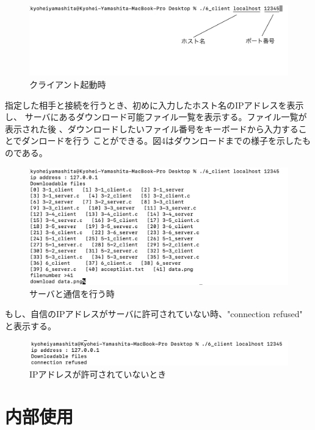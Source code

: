\documentclass[dvipdfmx,autodetect-engine,titlepage]{jsarticle}
\begin{document}
\begin{figure}[h]
    \centering
    \includegraphics[scale=0.8]{pic1.png}
    \caption{クライアント起動時}
\end{figure}

指定した相手と接続を行うとき、初めに入力したホスト名のIPアドレスを表示し、
サーバにあるダウンロード可能ファイル一覧を表示する。ファイル一覧が表示された後
、ダウンロードしたいファイル番号をキーボードから入力することでダンロードを行う
ことができる。図4はダウンロードまでの様子を示したものである。

\begin{figure}[h]
    \centering
    \includegraphics[scale=0.8]{pic2.png}
    \caption{サーバと通信を行う時}
\end{figure}

もし、自信のIPアドレスがサーバに許可されていない時、"connection refused"
と表示する。

\begin{figure}[h]
    \centering
    \includegraphics[scale=0.8]{pic4.png}
    \caption{IPアドレスが許可されていないとき}
\end{figure}

\section{内部使用}
\end{document}
